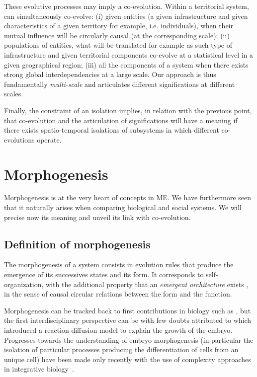 \documentclass[letterpaper]{article}
\begin{document}
These evolutive processes may imply a co-evolution. Within a territorial system, can simultaneously co-evolve: (i) given entities (a given infrastructure and given characteristics of a given territory for example, i.e. individuals), when their mutual influence will be circularly causal (at the corresponding scale); (ii) populations of entities, what will be translated for example as such type of infrastructure and given territorial components co-evolve at a statistical level in a given geographical region; (iii) all the components of a system when there exists strong global interdependencies at a large scale. Our approach is thus fundamentally \emph{multi-scale} and articulates different significations at different scales.

Finally, the constraint of an isolation implies, in relation with the previous point, that co-evolution and the articulation of significations will have a meaning if there exists spatio-temporal isolations of subsystems in which different co-evolutions operate.






\section{Morphogenesis}


Morphogenesis is at the very heart of concepts in ME. We have furthermore seen that it naturally arises when comparing biological and social systems. We will precise now its meaning and unveil its link with co-evolution.


\subsection{Definition of morphogenesis}


The morphogenesis of a system consists in evolution rules that produce the emergence of its successives states and its form. It corresponds to self-organization, with the additional property that an \emph{emergent architecture} exists \citep{doursat2012morphogenetic}, in the sense of causal circular relations between the form and the function.



Morphogenesis can be tracked back to first contributions in biology such as \citep{thompson1942growth}, but the first interdisciplinary perspective can be with few doubts attributed to \cite{Turing1952} which introduced a reaction-diffusion model to explain the growth of the embryo. Progresses towards the understanding of embryo morphogenesis (in particular the isolation of particular processes producing the differentiation of cells from an unique cell) have been made only recently with the use of complexity approaches in integrative biology~\citep{delile2016chapitre}.
\end{document}
